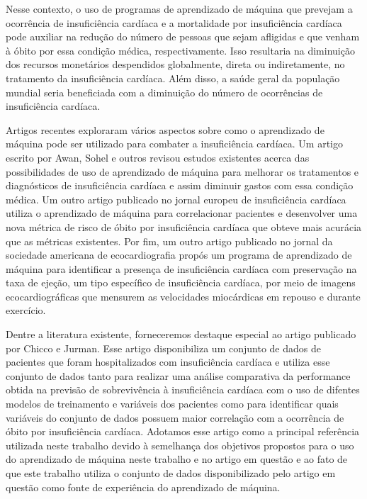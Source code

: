 Nesse contexto, o uso de programas de aprendizado de máquina que prevejam a ocorrência de insuficiência cardíaca e a mortalidade por insuficiência cardíaca pode auxiliar na redução do número de pessoas que sejam afligidas e que venham à óbito por essa condição médica, respectivamente. Isso resultaria na diminuição dos recursos monetários despendidos globalmente, direta ou indiretamente, no tratamento da insuficiência cardíaca. Além disso, a saúde geral da população mundial seria beneficiada com a diminuição do número de ocorrências de insuficiência cardíaca.

Artigos recentes exploraram vários aspectos sobre como o aprendizado de máquina pode ser utilizado para combater a insuficiência cardíaca. Um artigo escrito por Awan, Sohel e outros revisou estudos existentes acerca das possibilidades de uso de aprendizado de máquina para melhorar os tratamentos e diagnósticos de insuficiência cardíaca e assim diminuir gastos com essa condição médica\cite{awan2018}. Um outro artigo publicado no jornal europeu de insuficiência cardíaca utiliza o aprendizado de máquina para correlacionar pacientes e desenvolver uma nova métrica de risco de óbito por insuficiência cardíaca que obteve mais acurácia que as métricas existentes\cite{adler2020}. Por fim, um outro artigo publicado no jornal da sociedade americana de ecocardiografia propós um programa de aprendizado de máquina para identificar a presença de insuficiência cardíaca com preservação na taxa de ejeção, um tipo específico de insuficiência cardíaca, por meio de imagens ecocardiográficas que mensurem as velocidades miocárdicas em repouso e durante exercício\cite{hfpef2018}.

Dentre a literatura existente, forneceremos destaque especial ao artigo publicado por Chicco e Jurman\cite{chicco2020}. Esse artigo disponibiliza um conjunto de dados de pacientes que foram hospitalizados com insuficiência cardíaca\cite{larxel_dataset} e utiliza esse conjunto de dados tanto para realizar uma análise comparativa da performance obtida na previsão de sobrevivência à insuficiência cardíaca com o uso de difentes modelos de treinamento e variáveis dos pacientes como para identificar quais variáveis do conjunto de dados possuem maior correlação com a ocorrência de óbito por insuficiência cardíaca. Adotamos esse artigo como a principal referência utilizada neste trabalho devido à semelhança dos objetivos propostos para o uso do aprendizado de máquina neste trabalho e no artigo em questão e ao fato de que este trabalho utiliza o conjunto de dados disponibilizado pelo artigo em questão como fonte de experiência do aprendizado de máquina.
